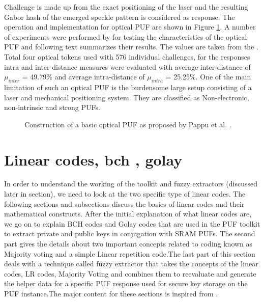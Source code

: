 Challenge is made up from the exact positioning of the laser and the resulting Gabor hash of the emerged speckle pattern is considered as response. The operation and implementation for optical PUF are shown in Figure \ref{img:optical}. A number of experiments were performed by \cite{19,39} for testing the characteristics of the optical PUF and following text summarizes their results. The values are taken from the \cite{19,39}. Total four optical tokens used with 576 individual challenges, for the
responses intra and inter-distance measures were evaluated with average inter-distance of $\mu_{inter}$ = 49.79\% and average intra-distance of
$\mu_{intra}$ = 25.25\%. One of the main limitation of such an optical PUF is the burdensome large setup consisting of a laser and mechanical positioning system. They are classified as Non-electronic, non-intrinsic and strong PUFs.\\

\begin{figure}
\centering
{}
\caption{Construction of a basic optical PUF as proposed by Pappu et al. \cite{18,19}.}
\label{img:optical}
\end{figure}

\section{Linear codes, bch , golay}
In order to understand the working of the toolkit and fuzzy extractors (discussed later in section), we need to look at the two specific type of linear codes. The following sections and subsections discuss the basics of linear codes and their mathematical constructs. After the initial explanation of what linear codes are, we go on to explain BCH codes and Golay codes that are used in the PUF toolkit to extract private and public keys in conjugation with SRAM PUFs. The second part
gives the details about two important concepts related to coding known as Majority voting and a simple Linear repetition code.The last part of
this section deals with a technique called fuzzy extractor that takes the concepts of the linear codes, LR codes, Majority Voting and combines them to reevaluate and generate the helper data for a specific PUF response used for secure key storage on the PUF instance.The major
content for these sections is inspired from \cite{chap2}.\\

